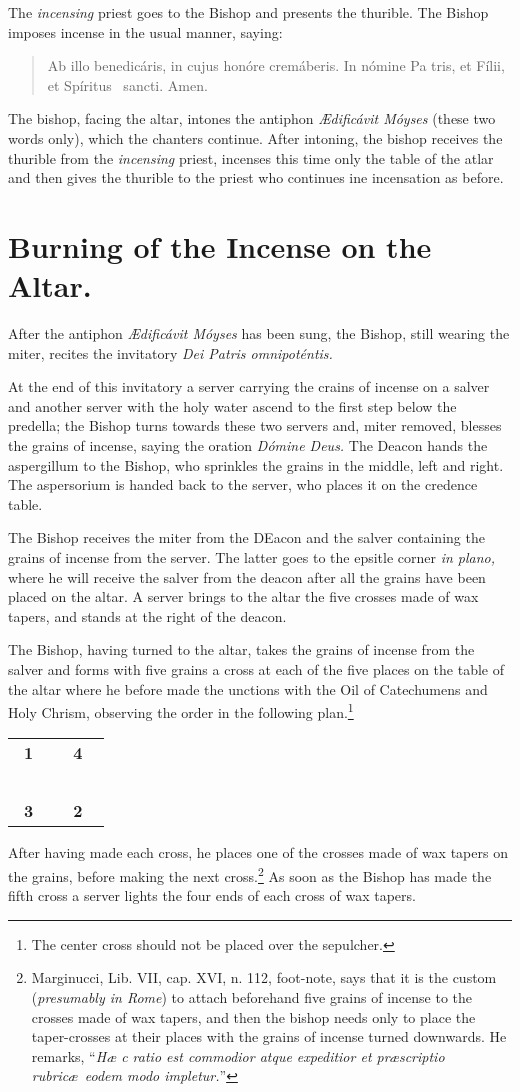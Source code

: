 \documentclass[letterpaper]{report}
\newcommand\blessincense{
\begin{quote}
   Ab illo benedicáris, in cujus honóre cremáberis. In nómine Pa\cross
    tris, et Fí\cross lii, et Spíritus \cross\ sancti. \rbar Amen.
\end{quote}
}
\newcommand\crossplan{
\begin{center}
    \begin{tabular}{ | l c r | }
       \hline
       \cross\ \textbf{1} &                    & \textbf{4} \cross\ \\
                          &       \cross\      &                    \\
       \cross\ \textbf{3} &                    & \textbf{2} \cross\ \\
       \hline
   \end{tabular} 
\end{center}
}
\begin{document}
{\rubric The \textit{incensing} priest goes to the Bishop and presents the
thurible. The Bishop imposes incense in the usual manner, saying:

\blessincense

The bishop, facing the altar, intones the antiphon \textit{\AE dificávit
Móyses} (these two words only), which the chanters continue. After intoning,
the bishop receives the thurible from the \textit{incensing} priest, incenses
this time only the table of the atlar and then gives the thurible to the priest
who continues ine incensation as before.

\section{Burning of the Incense on the Altar.}

\rubric After the antiphon \textit{\AE dificávit Móyses} has been sung, the
Bishop, still wearing the miter, recites the invitatory \textit{Dei Patris
omnipoténtis.}

\rubric At the end of this invitatory a server carrying the crains of incense
on a salver and another server with the holy water ascend to the first step
below the predella; the Bishop turns towards these two servers and, miter
removed, blesses the grains of incense, saying the oration \textit{Dómine
Deus.} The Deacon hands the aspergillum to the Bishop, who sprinkles the grains in
the middle, left and right. The aspersorium is handed back to the server, who
places it on the credence table.

The Bishop receives the miter from the DEacon and the salver containing the
grains of incense from the server. The latter goes to the epsitle corner
\textit{in plano,} where he will receive the salver from the deacon after all
the grains have been placed on the altar. A server brings to the altar the five
crosses made of wax tapers, and stands at the right of the deacon.

\rubric The Bishop, having turned to the altar, takes the grains of incense
from the salver and forms with five grains a cross at each of the five places
on the table of the altar where he before made the unctions with the Oil of
Catechumens and Holy Chrism, observing the order in the following
plan.\footnote{The center cross should not be placed over the sepulcher.}

\crossplan

After having made each cross, he places one of the crosses made of wax tapers
on the grains, before making the next cross.\footnote{Marginucci, Lib. VII,
cap. XVI, n. 112, foot-note, says that it is the custom (\textit{presumably in
Rome}) to attach beforehand five grains of incense to the crosses made of wax
tapers, and then the bishop needs only to place the taper-crosses at their
places with the grains of incense turned downwards. He remarks, ``\textit{H\ae
c ratio est commodior atque expeditior et pr\ae scriptio rubric\ae\ eodem modo
impletur.}''} As soon as the Bishop has made the fifth cross a server lights
the four ends of each cross of wax tapers.

}
\end{document}
